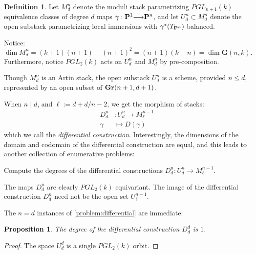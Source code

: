\documentclass[11pt,reqno]{amsart}
\theoremstyle{plain}
\newtheorem{proposition}[theorem]{Proposition}
\theoremstyle{definition}
\newtheorem{definition}[theorem]{Definition}
\theoremstyle{remark}
\numberwithin{equation}{section}
\newcommand{\todo}[1]{\fbox{ToDo: #1}}
\renewcommand{\to}{{\longrightarrow}}
\numberwithin{equation}{section}
\newcommand{\G}{\mathbf G}
\begin{document}
\begin{definition}
  Let $M^{n}_{d}$ denote the moduli stack parametrizing $PGL_{n+1}(k)$
  equivalence classes of degree $d$ maps $\gamma : \P^{1} \to \P^{n}$, and let
  $U^{n}_{d} \subset M^{n}_{d}$ denote the open substack parametrizing local immersions with $\gamma^{*}(T_{\P^{n}})$ balanced.
\end{definition}

\begin{remark}
Notice:  $\dim M^{n}_d= (k+1)(n+1) - (n+1)^{2} = (n+1)(k-n) = \dim \G(n, k).$  Furthermore, notice  $PGL_{2}(k)$ acts on $U^{n}_{d}$ and $M^{n}_{d}$ by pre-composition. 
\end{remark}  

\begin{remark}
  Though $M^{n}_{d}$ is an Artin stack, the open substack $U^{n}_{d}$ is a scheme, provided $n \leq d$, represented by an open subset of $\Gr(n+1,d+1)$. 
\end{remark}




When $n \mid d$, and $\ell := d+d/n-2$, we get the morphism of stacks: 
\begin{align*}
  D^{n}_{d} &: U^{n}_{d} \to M^{n-1}_{\ell}\\
  \gamma &\longmapsto D(\gamma)
\end{align*}
which we call the {\sl differential construction}. Interestingly, the dimensions of the domain and codomain of the differential construction are equal, and this leads to another collection of enumerative problems: 
\begin{problem}\label{problem:differential}
   Compute the degrees of the differential constructions $D^{n}_{d} : U^{n}_{d} \to M^{n-1}_{\ell}$. 
 \end{problem} 

\begin{remark}
  The maps $D^{n}_{d}$ are clearly $PGL_{2}(k)$ equivariant.  The image of the differential construction $D^{n}_{d}$ need not be the open set $U^{n-1}_{\ell}$. \todo{Sure?}
\end{remark}


 The $n=d$ instances of \autoref{problem:differential} are immediate: 

 \begin{proposition}\label{proposition:trivialdegree}
   The degree of the differential construction $D^{d}_{d}$ is $1$.
 \end{proposition}
\begin{proof}
  The space $U^{d}_{d}$ is a single $PGL_{2}(k)$ orbit.
\end{proof}
 
\end{document}
